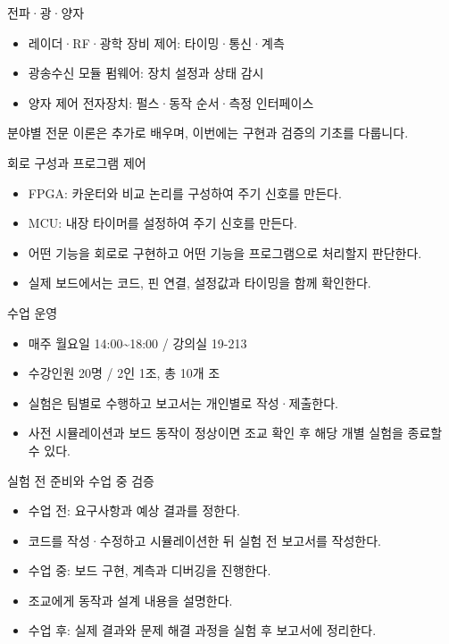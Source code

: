 \documentclass[aspectratio=169,11pt,t]{beamer}
\begin{document}
\begin{frame}{전파·광·양자}
\begin{itemize}
\item 레이더·RF·광학 장비 제어: 타이밍·통신·계측
\item 광송수신 모듈 펌웨어: 장치 설정과 상태 감시
\item 양자 제어 전자장치: 펄스·동작 순서·측정 인터페이스
\end{itemize}
\vspace{0.35cm}
분야별 전문 이론은 추가로 배우며, 이번에는 구현과 검증의 기초를 다룹니다.
\end{frame}

\begin{frame}{회로 구성과 프로그램 제어}
\begin{itemize}
\item FPGA: 카운터와 비교 논리를 구성하여 주기 신호를 만든다.
\item MCU: 내장 타이머를 설정하여 주기 신호를 만든다.
\item 어떤 기능을 회로로 구현하고 어떤 기능을 프로그램으로 처리할지 판단한다.
\item 실제 보드에서는 코드, 핀 연결, 설정값과 타이밍을 함께 확인한다.
\end{itemize}
\end{frame}

\begin{frame}{수업 운영}
\begin{itemize}
\item 매주 월요일 14:00\textasciitilde{}18:00 / 강의실 19-213
\item 수강인원 20명 / 2인 1조, 총 10개 조
\item 실험은 팀별로 수행하고 보고서는 개인별로 작성·제출한다.
\item 사전 시뮬레이션과 보드 동작이 정상이면 조교 확인 후 해당 개별 실험을 종료할 수 있다.
\end{itemize}
\end{frame}

\begin{frame}{실험 전 준비와 수업 중 검증}
\begin{itemize}
\item 수업 전: 요구사항과 예상 결과를 정한다.
\item 코드를 작성·수정하고 시뮬레이션한 뒤 실험 전 보고서를 작성한다.
\item 수업 중: 보드 구현, 계측과 디버깅을 진행한다.
\item 조교에게 동작과 설계 내용을 설명한다.
\item 수업 후: 실제 결과와 문제 해결 과정을 실험 후 보고서에 정리한다.
\end{itemize}
\end{frame}
\end{document}

